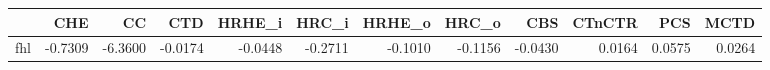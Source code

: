 \begin{tabular}{lrrrrrrrrrrr}
\toprule
 & CHE & CC & CTD & HRHE_i & HRC_i & HRHE_o & HRC_o & CBS & CTnCTR & PCS & MCTD \\
\midrule
fhl & -0.7309 & -6.3600 & -0.0174 & -0.0448 & -0.2711 & -0.1010 & -0.1156 & -0.0430 & 0.0164 & 0.0575 & 0.0264 \\
\bottomrule
\end{tabular}
